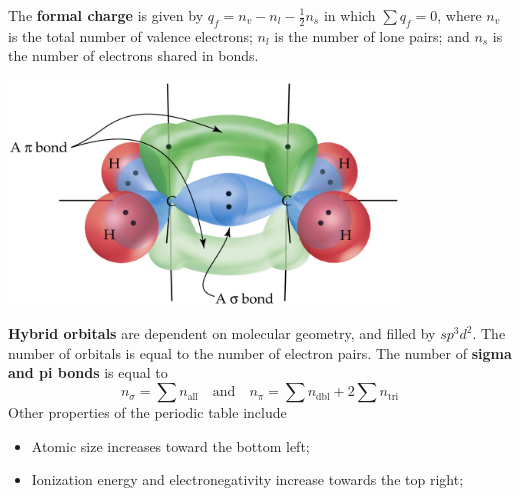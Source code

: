 \documentclass{tufte-book}
\renewcommand{\emph}[1]{\textbf{#1}}
\begin{document}
The \emph{formal charge} is given by $q_f = n_v - n_l - \frac{1}{2} n_s$ in which $\sum q_f = 0$, where $n_v$ is the total number of valence electrons; $n_l$ is the number of lone pairs; and $n_s$ is the number of electrons shared in bonds.
%
\begin{marginfigure}
\begin{center}
  \includegraphics[width=0.78\textwidth]{bonds} \phantom{mmmm}
\end{center}
\end{marginfigure}
%
\bigskip
\emph{Hybrid orbitals} are dependent on molecular geometry, and filled by $sp^3d^2$. The number of orbitals is equal to the number of electron pairs. The number of \emph{sigma and pi bonds} is equal to \begin{equation}
  n_\sigma = \sum n_\text{all} \quad\text{and}\quad n_\pi = \sum n_\text{dbl} + 2 \sum n_\text{tri}
\end{equation}
Other properties of the periodic table include \begin{itemize}
  \item Atomic size increases toward the bottom left;
  \item Ionization energy and electronegativity increase towards the top right;
\end{itemize}
\end{document}
